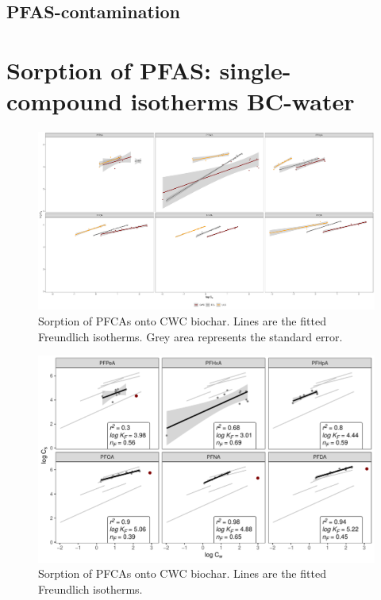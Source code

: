\subsection{PFAS-contamination}


\section{Sorption of PFAS: single-compound isotherms BC-water}

\begin{figure}
    \centering
    \includegraphics[width=\textwidth]{R/figs/Sorption_isotherms_single_BC.pdf}
    \caption{Sorption of PFCAs onto CWC biochar. Lines are the fitted Freundlich isotherms. Grey area represents the standard error.}
    \label{fig:Sorption_isotherms}
\end{figure}

\begin{figure}
    \centering
    \includegraphics[width=\textwidth]{R/figs/CWC_facet_isotherm.pdf}
    \caption{Sorption of PFCAs onto CWC biochar. Lines are the fitted Freundlich isotherms.}
    \label{fig:CWC_isotherm}
\end{figure}

